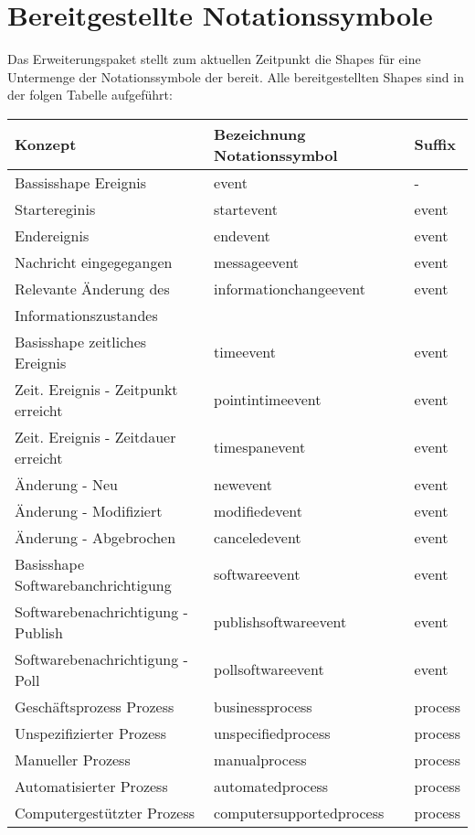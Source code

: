 \section{Bereitgestellte Notationssymbole}
\label{sec:Notationssymbole}
Das Erweiterungspaket stellt zum aktuellen Zeitpunkt die Shapes für eine Untermenge der Notationssymbole der \textit{\memoorgml} bereit. Alle bereitgestellten Shapes sind in der folgen Tabelle aufgeführt:
\begin{longtable}{lll}
        \toprule
        Konzept & Bezeichnung Notationssymbol & Suffix\\
        \midrule
        Bassisshape Ereignis & event & - \\
        Startereginis & startevent & event \\
        Endereignis & endevent & event \\
        Nachricht eingegegangen & messageevent & event \\
        Relevante Änderung des & informationchangeevent & event \\
        Informationszustandes & & \\
        Basisshape zeitliches Ereignis & timeevent & event \\
        Zeit. Ereignis - Zeitpunkt erreicht & pointintimeevent & event \\
        Zeit. Ereignis - Zeitdauer erreicht & timespanevent & event \\
        Änderung - Neu & newevent & event \\
        Änderung - Modifiziert & modifiedevent & event \\
        Änderung - Abgebrochen & canceledevent & event \\
        Basisshape Softwarebanchrichtigung & softwareevent & event \\
        Softwarebenachrichtigung - Publish & publishsoftwareevent & event \\
        Softwarebenachrichtigung - Poll & pollsoftwareevent & event \\
        Geschäftsprozess Prozess & businessprocess & process \\
        Unspezifizierter Prozess & unspecifiedprocess & process \\
        Manueller Prozess & manualprocess & process \\
        Automatisierter Prozess & automatedprocess & process \\
        Computergestützter Prozess & computersupportedprocess & process \\

\end{longtable}
